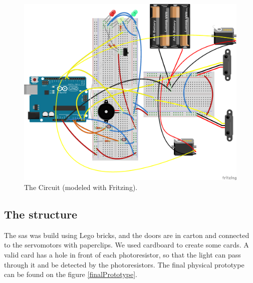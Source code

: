 \begin{figure}[!h]
	\centering
    \includegraphics[scale=0.5]{ElectronicScheme2.png}
    \caption{The Circuit (modeled with Fritzing).}
    \label{circuit}
\end{figure}

\subsection{The structure}
The sas was build using Lego bricks, and the doors are in carton and connected to the servomotors with paperclips. We used cardboard to create some cards. A valid card has a hole in front of each photoresistor, so that the light can pass through it and be detected by the photoresistors. The final physical prototype can be found on the figure \ref{finalPrototype}.




\newpage
